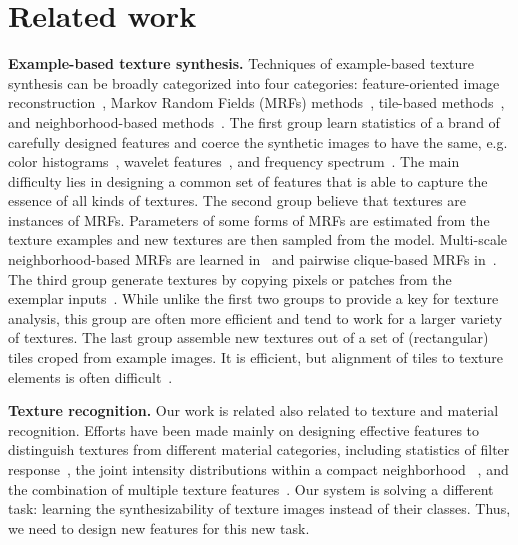 \section{Related work}
\textbf{Example-based texture synthesis.} Techniques of example-based
texture synthesis can be broadly categorized into four categories:
feature-oriented image reconstruction~\cite{Heeger:95,
  Portilla:2000:IJCV, random:phase}, Markov Random Fields (MRFs)
methods~\cite{noncausal:tip98, Zalesny05}, tile-based
methods~\cite{Cohen:2003:wang, Liu:2004:NTA}, and
neighborhood-based methods~\cite{Efros:sig2001, Kwatra:tog:2005,
  Kwatra:2003}. The first group learn statistics of a brand of
carefully designed features and coerce the synthetic images to have
the same, e.g. color histograms~\cite{Heeger:95}, wavelet
features~\cite{Portilla:2000:IJCV}, and frequency
spectrum~\cite{random:phase}.  The main difficulty lies in designing a
common set of features that is able to capture the essence of all
kinds of textures.  The second group believe that textures are
instances of MRFs. Parameters of some forms of MRFs are estimated from
the texture examples and new textures are then sampled from the
model. Multi-scale neighborhood-based MRFs are learned
in~\cite{noncausal:tip98} and pairwise clique-based MRFs
in~\cite{Zalesny05}. The third group generate textures by copying
pixels or patches from the exemplar inputs~\cite{Efros:1999,
  Efros:sig2001, Kwatra:2003, Kwatra:tog:2005}. While unlike the first
two groups to provide a key for texture analysis, this group are often
more efficient and tend to work for a larger variety of textures. The
last group assemble new textures out of a set of (rectangular) tiles
croped from example images. It is efficient, but alignment of tiles to
texture elements is often difficult~\cite{Cohen:2003:wang,
  Liu:2004:NTA, dai:facade:iccv13}.

\textbf{Texture recognition.}  Our work is related also related to
texture and material recognition. Efforts have been made mainly on
designing effective features to distinguish textures from different
material categories, including statistics of filter
response~\cite{texton:2001}, the joint intensity distributions within
a compact neighborhood ~\cite{material:pami:09, sorted:texture}, and
the combination of multiple texture features~\cite{material:ijcv13}.
Our system is solving a different task: learning the synthesizability
of texture images instead of their classes. Thus, we need to design
new features for this new task. 
